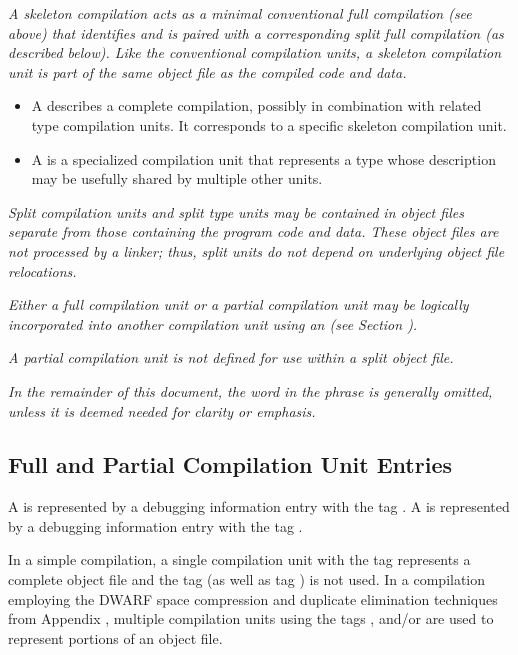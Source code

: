 \textit{A skeleton compilation acts as a minimal conventional full
compilation (see above) that identifies and is paired with a
corresponding split full compilation (as described below). Like
the conventional compilation units, a skeleton compilation unit
is part of the same object file as the compiled code and data.}

\begin{itemize}
\item A
 describes
a complete compilation, possibly in combination with
related type compilation units. It corresponds
to a specific skeleton compilation unit.

\item A  is a specialized
compilation unit that represents a type whose description may
be usefully shared by multiple other units.

\end{itemize}

\textit{Split compilation units and split type units may be
contained in object files separate from those containing the
program code and data.
These object files are not processed by a linker; thus,
split units do not depend on underlying object file relocations.}

\textit{Either a full compilation unit or a partial compilation
unit may be logically incorporated into another compilation unit
using an 
(see Section ).}

\textit{A partial compilation unit is not defined for use
within a split object file.}

\textit{In the remainder of this document, the word
 in the phrase 
is generally omitted, unless it is deemed needed for clarity
or emphasis.}

\subsection{Full and Partial Compilation Unit Entries}
\label{chap:fullandpartialcompilationunitentries}
A 
is represented by a debugging information entry with the tag
\DWTAGcompileunitTARG.
A 
is represented by a debugging information entry with the tag
\DWTAGpartialunitTARG.

In a simple compilation, a single compilation unit with
the tag
\DWTAGcompileunit{} represents a complete object file
and the tag
\DWTAGpartialunit{} (as well as tag \DWTAGtypeunit) is not used.
In a compilation
employing the DWARF space compression and duplicate elimination
techniques from
Appendix ,
multiple compilation units using
the tags
\DWTAGcompileunit{},
\DWTAGpartialunit{} and/or
\DWTAGtypeunit{}
are used to represent portions of an object file.

